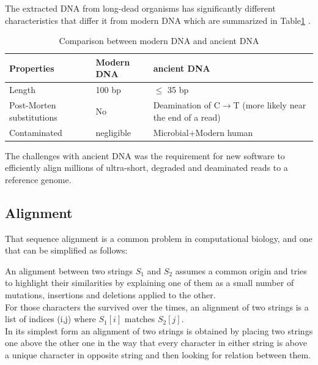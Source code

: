 \documentclass[11pt,a4paper]{report}
\begin{document}
The extracted DNA from long-dead organisms has significantly different characteristics
 that differ it from modern DNA which are summarized in Table\ref{aDNAchar} .\\



\begin{table}[H]
  \begin{tabular}{ |  p{4cm} | p{2cm} | p{5cm} |}
    \hline
  \textbf{  Properties} & \textbf{Modern DNA } &\textbf{ ancient DNA} \\ \hline
       Length &  100 bp  & $\leq$  35 bp \\ \hline
       Post-Morten substitutions & No  & Deamination of C$\to$T
(more likely near the end of a read) \\ \hline
  Contaminated & negligible & Microbial+Modern human\\ \hline
    \end{tabular}
\caption{Comparison between modern DNA and ancient DNA}
\label{aDNAchar}
\end{table}


The challenges with ancient DNA was the requirement for new software to efficiently 
align millions of ultra-short, degraded and deaminated reads to a reference genome.


\subsection{Alignment} \label{Alignment}

That sequence alignment is a common problem in computational biology, 
and one that can be simplified as follows:

An alignment between two strings $S_{1}$ and $S_{2}$ assumes a common origin and 
tries to highlight their similarities by explaining one of them as a small number 
of mutations, insertions and deletions applied to the other.\\

For those characters the survived over the times, an alignment of two strings is 
a list of indices (i,j) where $S_{1}[i]$ matches $S_{2}[j]$.\\ 
In its simplest form an alignment of two strings is obtained by placing two strings
one above the other one in the way that every character in either string is above 
a unique character in opposite string and then looking for relation between them.\\\\
\end{document}
